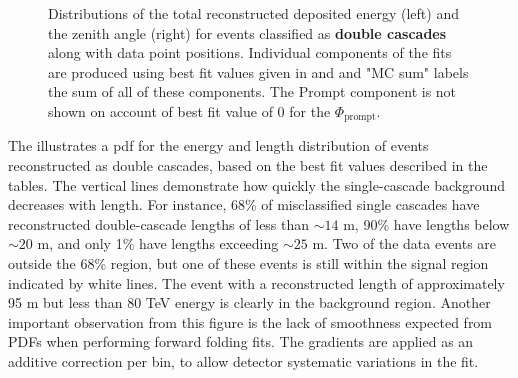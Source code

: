 \begin{figure}[h]
\begin{subfigure}[h]{0.7\textwidth}
    \end{subfigure}%
    \caption[Data/MC agreement for HESE-12 Double Cascades]{Distributions of the total reconstructed deposited energy (left) and the zenith angle (right) for events classified as \textbf{double cascades} along with data point positions. Individual components of the fits are produced using best fit values given in  and  and "MC sum" labels the sum of all of these components. The Prompt component is not shown on account of best fit value of 0 for the $\Phi_{\mathrm{prompt}}$.}
\end{figure}
The  illustrates a pdf for the energy and length distribution of events reconstructed as double cascades, based on the best fit values described in the tables. The vertical lines demonstrate how quickly the single-cascade background decreases with length. For instance, 68\% of misclassified single cascades have reconstructed double-cascade lengths of less than $\sim 14$ m, 90\% have lengths below $\sim  20$ m, and only 1\% have lengths exceeding $\sim 25$ m. Two of the data events are outside the 68\% region, but one of these events is still within the signal region indicated by white lines. The event with a reconstructed length of approximately 95 m but less than 80 TeV energy is clearly in the background region. Another important observation from this figure is the lack of smoothness expected from PDFs when performing forward folding fits. The gradients are applied as an additive correction per bin, to allow detector systematic variations in the fit. 
